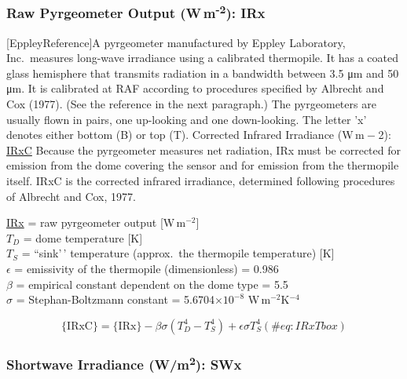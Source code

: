 \documentclass[
  english,
]{book}
\begin{document}
\hypertarget{irx}{%
\subsubsection*{\texorpdfstring{Raw Pyrgeometer Output
(W m\textsuperscript{-2}):
IRx}{Raw Pyrgeometer Output (W m-2): IRx}}\label{irx}}

\protect\hypertarget{EppleyReference}{}{{[}EppleyReference{]}}A
pyrgeometer manufactured by Eppley Laboratory, Inc.~measures long-wave
irradiance using a calibrated thermopile. It has a coated glass
hemisphere that transmits radiation in a bandwidth between 3.5 {μm} and
50 {μm}. It is calibrated at RAF according to procedures specified by
Albrecht and Cox (1977). (See the reference in the next paragraph.) The
pyrgeometers are usually flown in pairs, one up-looking and one
down-looking. The letter 'x' denotes either bottom (B) or top (T).
Corrected Infrared Irradiance (W m{ − 2}): \underline{IRxC} Because the
pyrgeometer measures net radiation, IRx must be corrected for emission
from the dome covering the sensor and for emission from the thermopile
itself. IRxC is the corrected infrared irradiance, determined following
procedures of Albrecht and Cox, 1977.

\protect\hyperlink{irx}{IRx} = raw pyrgeometer output
{[}W\(\,\)m\(^{-2}\){]}\\
\(T_{D}\) = dome temperature {[}K{]}\\
\(T_{S}\) = ``sink'\,' temperature (approx.~the thermopile temperature)
{[}K{]}\\
\(\epsilon\) = emissivity of the thermopile (dimensionless) = 0.986\\
\(\beta\) = empirical constant dependent on the dome type = 5.5\\
\(\sigma\) = Stephan-Boltzmann constant = 5.6704\(\times10^{-8}\)
W\(\,\)m\(^{-2}\)K\(^{-4}\)

\begin{equation}
\mathrm{\{IRxC\}}=\mathrm{\{IRx\}}-\beta\sigma(T_{D}^{4}-T_{S}^{4})+\epsilon\sigma T_{S}^{4}
(\#eq:IRxTbox)
\end{equation}

\hypertarget{swx}{%
\subsubsection*{\texorpdfstring{Shortwave Irradiance
(W/m\textsuperscript{2}):
SWx}{Shortwave Irradiance (W/m2): SWx}}\label{swx}}
\end{document}
